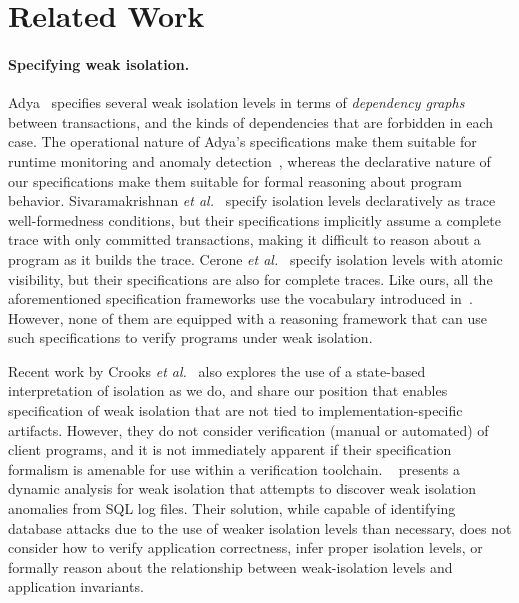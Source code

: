 \vspace*{-6pt}
\section{Related Work}
\label{sec:relatedwork}

\paragraph{Specifying weak isolation.}
Adya~\cite{adyaphd} specifies several weak isolation levels in terms
of \emph{dependency graphs} between transactions, and the kinds of
dependencies that are forbidden in each case. The operational nature
of Adya's specifications make them suitable for runtime monitoring and
anomaly detection~\cite{kemmevldb,feketesigmod08,pssi2011}, whereas
the declarative nature of our specifications make them suitable for
formal reasoning about program behavior. Sivaramakrishnan \emph{et
al.}~\cite{pldi15} specify isolation levels declaratively as trace
well-formedness conditions, but their specifications implicitly assume
a complete trace with only committed transactions, making it difficult
to reason about a program as it builds the trace. Cerone \emph{et
al.}~\cite{gotsmanconcur15} specify isolation levels with atomic
visibility, but their specifications are also for complete traces.
Like ours, all the aforementioned specification frameworks use the
vocabulary introduced in~\cite{burckhardt14}. However, none of them
are equipped with a reasoning framework that can use such
specifications to verify programs under weak isolation.

Recent work by Crooks \emph{et al.}~\cite{CPA+17} also explores the
use of a state-based interpretation of isolation as we do, and share
our position that enables specification of weak isolation that are not
tied to implementation-specific artifacts.  However, they do not
consider verification (manual or automated) of client programs, and it
is not immediately apparent if their specification formalism is
amenable for use within a verification toolchain.  ~\cite{WB17}
presents a dynamic analysis for weak isolation that attempts to
discover weak isolation anomalies from SQL log files.  Their solution,
while capable of identifying database attacks due to the use of weaker
isolation levels than necessary, does not consider how to verify
application correctness, infer proper isolation levels, or formally
reason about the relationship between weak-isolation levels and
application invariants.

